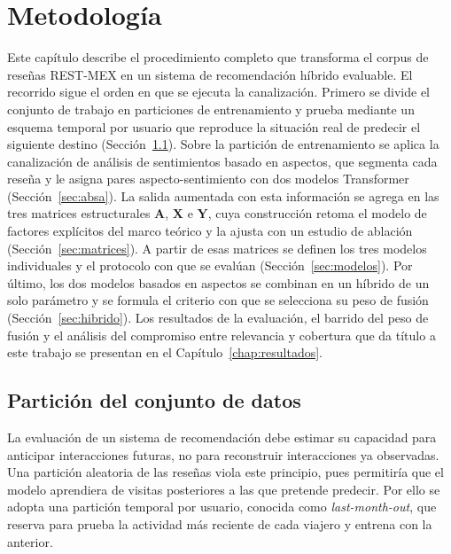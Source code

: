 \chapter{Metodología}\label{chap:metodologia}

Este capítulo describe el procedimiento completo que transforma el corpus de reseñas
REST-MEX en un sistema de recomendación híbrido evaluable. El recorrido sigue el orden
en que se ejecuta la canalización. Primero se divide el conjunto de trabajo en
particiones de entrenamiento y prueba mediante un esquema temporal por usuario que
reproduce la situación real de predecir el siguiente destino (Sección~\ref{sec:split}).
Sobre la partición de entrenamiento se aplica la canalización de análisis de sentimientos
basado en aspectos, que segmenta cada reseña y le asigna pares aspecto-sentimiento con dos
modelos Transformer (Sección~\ref{sec:absa}). La salida aumentada con esta información se
agrega en las tres matrices estructurales $\mathbf{A}$, $\mathbf{X}$ e $\mathbf{Y}$, cuya
construcción retoma el modelo de factores explícitos del marco teórico y la ajusta con un
estudio de ablación (Sección~\ref{sec:matrices}). A partir de esas matrices se definen los
tres modelos individuales y el protocolo con que se evalúan (Sección~\ref{sec:modelos}).
Por último, los dos modelos basados en aspectos se combinan en un híbrido de un solo
parámetro y se formula el criterio con que se selecciona su peso de fusión
(Sección~\ref{sec:hibrido}). Los resultados de la evaluación, el barrido del peso de fusión
y el análisis del compromiso entre relevancia y cobertura que da título a este trabajo se
presentan en el Capítulo~\ref{chap:resultados}.

\section{Partición del conjunto de datos}\label{sec:split}

La evaluación de un sistema de recomendación debe estimar su capacidad para anticipar
interacciones futuras, no para reconstruir interacciones ya observadas. Una partición
aleatoria de las reseñas viola este principio, pues permitiría que el modelo aprendiera de
visitas posteriores a las que pretende predecir. Por ello se adopta una partición temporal
por usuario, conocida como \textit{last-month-out}, que reserva para prueba la actividad más
reciente de cada viajero y entrena con la anterior.

